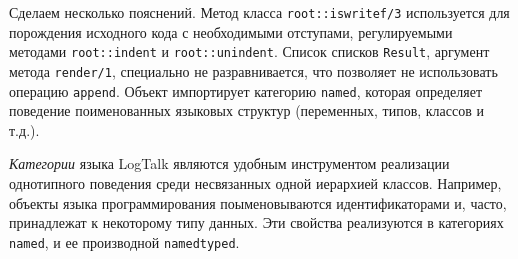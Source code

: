 \documentclass[conference]{IEEEtran} \IEEEoverridecommandlockouts
\begin{document}


Сделаем несколько пояснений. Метод класса \verb|root::iswritef/3| используется для порождения исходного кода с необходимыми отступами, регулируемыми методами \verb|root::indent| и \verb|root::unindent|. Список списков \verb|Result|, аргумент метода \verb|render/1|, специально не разравнивается, что позволяет не использовать операцию \verb|append|. Объект импортирует категорию \verb|named|, которая определяет поведение поименованных языковых структур (переменных, типов, классов и т.д.).

\emph{Категории} языка LogTalk являются удобным инструментом реализации однотипного поведения среди несвязанных одной иерархией классов. Например, объекты языка программирования поыменовываются идентификаторами и, часто, принадлежат к некоторому типу данных. Эти свойства реализуются в категориях \texttt{named}, и ее производной \texttt{namedtyped}.
\end{document}
